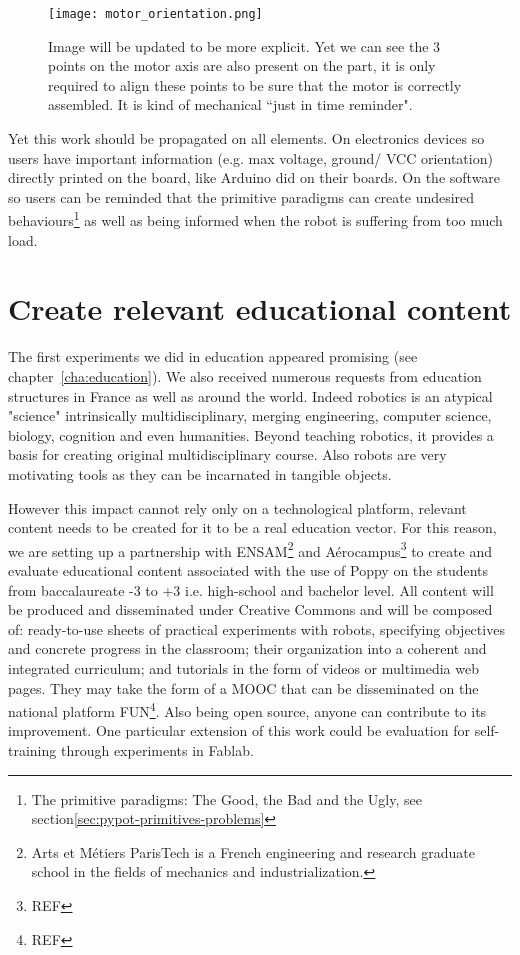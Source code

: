 \begin{figure}[tb]
    \centering
        \texttt{[image: motor\_orientation.png]}
    \caption{Image will be updated to be more explicit. Yet we can see the 3 points on the motor axis are also present on the part, it is only required to align these points to be sure that the motor is correctly assembled. It is kind of mechanical “just in time reminder".}
    \label{fig:motor_orientation}
\end{figure}

Yet this work should be propagated on all elements. On electronics devices so users have important information (e.g. max voltage, ground/ VCC orientation) directly printed on the board, like Arduino did on their boards. On the software so users can be reminded that the primitive paradigms can create undesired behaviours\footnote{The primitive paradigms: The Good, the Bad and the Ugly, see section\ref{sec:pypot-primitives-problems}} as well as being informed when the robot is suffering from too much load.

\section{Create relevant educational content} %

The first experiments we did in education appeared promising (see chapter~\ref{cha:education}). We also received numerous requests from education structures in France as well as around the world. Indeed robotics is an atypical "science" intrinsically multidisciplinary, merging engineering, computer science, biology, cognition and even humanities. Beyond teaching robotics, it provides a basis for creating original multidisciplinary course. Also robots are very motivating tools as they can be incarnated in tangible objects.

However this impact cannot rely only on a technological platform, relevant content needs to be created for it to be a real education vector.
For this reason, we are setting up a partnership with ENSAM\footnote{Arts et Métiers ParisTech is a French engineering and research graduate school in the fields of mechanics and industrialization.} and Aérocampus\footnote{REF} to create and evaluate educational content associated with the use of Poppy on the students from baccalaureate -3 to +3 i.e. high-school and bachelor level. All content will be produced and disseminated under Creative Commons and will be composed of: ready-to-use sheets of practical experiments with robots, specifying objectives and concrete progress in the classroom; their organization into a coherent and integrated curriculum; and tutorials in the form of videos or multimedia web pages. They may take the form of a MOOC that can be disseminated on the national platform FUN\footnote{REF}. Also being open source, anyone can contribute to its improvement. One particular extension of this work could be evaluation for self-training through experiments in Fablab.



